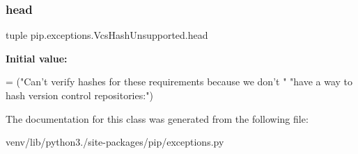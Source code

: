 \subsubsection{\texorpdfstring{head}{head}}
{\footnotesize\ttfamily tuple pip.\+exceptions.\+Vcs\+Hash\+Unsupported.\+head\hspace{0.3cm}{\ttfamily [static]}}

{\bfseries Initial value\+:}
\begin{DoxyCode}
=  (\textcolor{stringliteral}{"Can't verify hashes for these requirements because we don't "}
            \textcolor{stringliteral}{"have a way to hash version control repositories:"})
\end{DoxyCode}


The documentation for this class was generated from the following file\+:\begin{DoxyCompactItemize}
\item 
venv/lib/python3./site-\/packages/pip/exceptions.\+py\end{DoxyCompactItemize}
